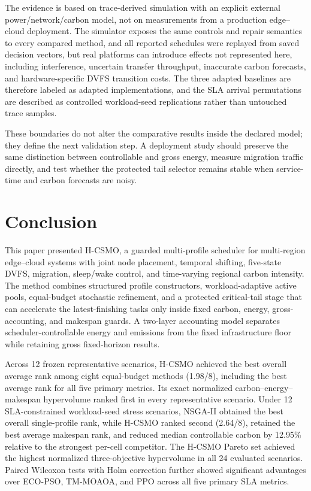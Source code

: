 \documentclass[preprint,12pt]{elsarticle}
\newcommand{\method}{H-CSMO\xspace}
\begin{document}
The evidence is based on trace-derived simulation with an explicit external power/network/carbon model, not on measurements from a production edge--cloud deployment. The simulator exposes the same controls and repair semantics to every compared method, and all reported schedules were replayed from saved decision vectors, but real platforms can introduce effects not represented here, including interference, uncertain transfer throughput, inaccurate carbon forecasts, and hardware-specific DVFS transition costs. The three adapted baselines are therefore labeled as adapted implementations, and the SLA arrival permutations are described as controlled workload-seed replications rather than untouched trace samples.

These boundaries do not alter the comparative results inside the declared model; they define the next validation step. A deployment study should preserve the same distinction between controllable and gross energy, measure migration traffic directly, and test whether the protected tail selector remains stable when service-time and carbon forecasts are noisy.
\section{Conclusion}
\label{sec:conclusion}

This paper presented \method, a guarded multi-profile scheduler for multi-region edge--cloud systems with joint node placement, temporal shifting, five-state DVFS, migration, sleep/wake control, and time-varying regional carbon intensity. The method combines structured profile constructors, workload-adaptive active pools, equal-budget stochastic refinement, and a protected critical-tail stage that can accelerate the latest-finishing tasks only inside fixed carbon, energy, gross-accounting, and makespan guards. A two-layer accounting model separates scheduler-controllable energy and emissions from the fixed infrastructure floor while retaining gross fixed-horizon results.

Across 12 frozen representative scenarios, \method achieved the best overall average rank among eight equal-budget methods (1.98/8), including the best average rank for all five primary metrics. Its exact normalized carbon--energy--makespan hypervolume ranked first in every representative scenario. Under 12 SLA-constrained workload-seed stress scenarios, NSGA-II obtained the best overall single-profile rank, while \method ranked second (2.64/8), retained the best average makespan rank, and reduced median controllable carbon by 12.95\% relative to the strongest per-cell competitor. The \method Pareto set achieved the highest normalized three-objective hypervolume in all 24 evaluated scenarios. Paired Wilcoxon tests with Holm correction further showed significant advantages over ECO-PSO, TM-MOAOA, and PPO across all five primary SLA metrics.
\end{document}
